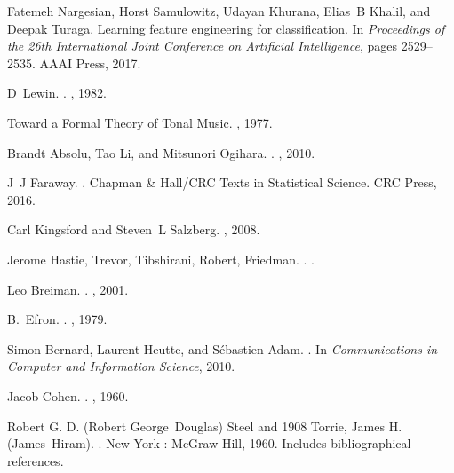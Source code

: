 \documentclass[twocolumn]{article}
\begin{document}
\begin{thebibliography}{1}
Fatemeh Nargesian, Horst Samulowitz, Udayan Khurana, Elias~B Khalil, and Deepak
  Turaga.
\newblock Learning feature engineering for classification.
\newblock In {\em Proceedings of the 26th International Joint Conference on
  Artificial Intelligence}, pages 2529--2535. AAAI Press, 2017.

D~Lewin.
.
, 1982.

{Toward a Formal Theory of Tonal Music}.
, 1977.

Brandt Absolu, Tao Li, and Mitsunori Ogihara.
.
, 2010.

J~J Faraway.
.
\newblock Chapman {\&} Hall/CRC Texts in Statistical Science. CRC Press, 2016.

Carl Kingsford and Steven~L Salzberg.
, 2008.

Jerome {Hastie, Trevor, Tibshirani, Robert, Friedman}.
.
.

Leo Breiman.
.
, 2001.

B.~Efron.
.
, 1979.

Simon Bernard, Laurent Heutte, and S{\'{e}}bastien Adam.
.
\newblock In {\em Communications in Computer and Information Science}, 2010.

Jacob Cohen.
.
, 1960.

Robert G. D. (Robert George~Douglas) Steel and 1908 Torrie, James H.
  (James~Hiram).
.
\newblock New York : McGraw-Hill, 1960.
\newblock Includes bibliographical references.


\end{thebibliography}
\end{document}
